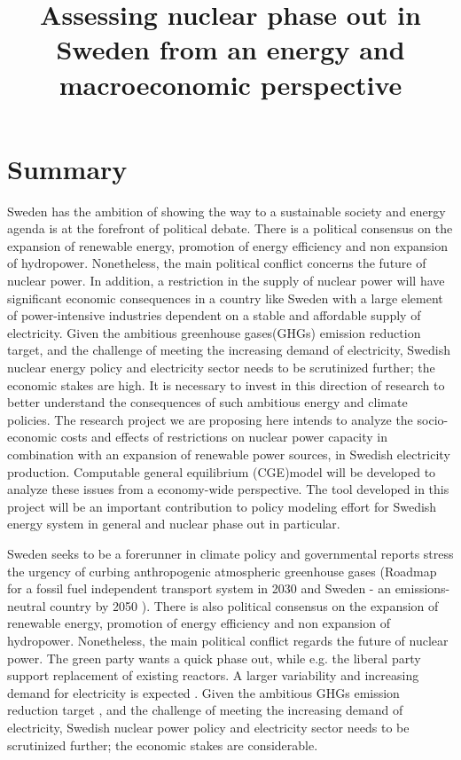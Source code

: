 


\title{Assessing nuclear phase out in Sweden from an energy and macroeconomic perspective}
\maketitle
\author{}
\date{}
\section{Summary}
Sweden has the ambition of showing the way to a sustainable society and energy agenda is at the forefront of political debate. There is a political consensus on the expansion of renewable energy, promotion of energy efficiency and non expansion of hydropower. Nonetheless, the main political conflict concerns the future of nuclear power. In addition, a restriction in the supply of nuclear power will have significant economic consequences in a country like Sweden with a large element of power-intensive industries dependent on a stable and affordable supply of electricity. Given the ambitious greenhouse gases(GHGs) emission reduction target, and the challenge of meeting the increasing demand of electricity, Swedish nuclear energy policy and electricity sector needs to be scrutinized further; the economic stakes are high. It is necessary to invest in this direction of research to better understand the consequences of such ambitious energy and climate policies. The research project we are proposing here intends to analyze the socio-economic costs and effects of restrictions on nuclear power capacity in combination with an expansion of renewable power sources, in Swedish electricity production. Computable general equilibrium (CGE)model will be developed to analyze these issues from a economy-wide perspective. The tool developed in this project will be an important contribution to policy modeling effort for Swedish energy system in general and nuclear phase out in particular.

Sweden seeks to be a forerunner in climate policy and governmental reports stress the urgency of curbing anthropogenic atmospheric greenhouse gases (Roadmap for a fossil fuel independent transport system in 2030 \cite{SOU201384} and Sweden - an emissions-neutral country by 2050 \cite{sepa2012}). There is also political consensus on the expansion of renewable energy, promotion of energy efficiency and non expansion of hydropower. Nonetheless, the main political conflict regards the future of nuclear power. The green party wants a quick phase out, while e.g. the liberal party support replacement of existing reactors. A larger variability and increasing demand for electricity is expected \cite{sepa2012, SOU201384}. Given the ambitious GHGs emission reduction target \cite{SOU201384}, and the challenge of meeting the increasing demand of electricity, Swedish nuclear power policy and electricity sector needs to be scrutinized further; the economic stakes are considerable.


